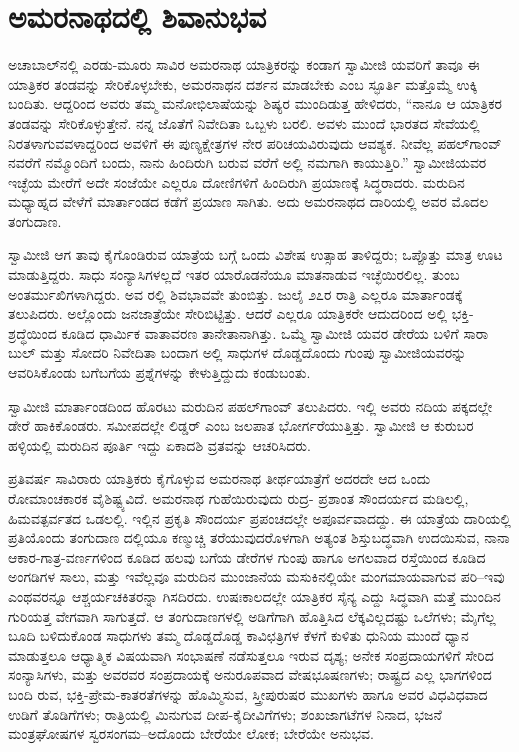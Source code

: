 
\chapter{ಅಮರನಾಥದಲ್ಲಿ ಶಿವಾನುಭವ}

\noindent

ಅಚಾಬಾಲ್​ನಲ್ಲಿ ಎರಡು-ಮೂರು ಸಾವಿರ ಅಮರನಾಥ ಯಾತ್ರಿಕರನ್ನು ಕಂಡಾಗ ಸ್ವಾಮೀಜಿ ಯವರಿಗೆ ತಾವೂ ಈ ಯಾತ್ರಿಕರ ತಂಡವನ್ನು ಸೇರಿಕೊಳ್ಳಬೇಕು, ಅಮರನಾಥನ ದರ್ಶನ ಮಾಡಬೇಕು ಎಂಬ ಸ್ಫೂರ್ತಿ ಮತ್ತೊಮ್ಮೆ ಉಕ್ಕಿ ಬಂದಿತು. ಆದ್ದರಿಂದ ಅವರು ತಮ್ಮ ಮನೋಭಿಲಾಷೆಯನ್ನು ಶಿಷ್ಯರ ಮುಂದಿಡುತ್ತ ಹೇಳಿದರು, “ನಾನೂ ಆ ಯಾತ್ರಿಕರ ತಂಡವನ್ನು ಸೇರಿಕೊಳ್ಳುತ್ತೇನೆ. ನನ್ನ ಜೊತೆಗೆ ನಿವೇದಿತಾ ಒಬ್ಬಳು ಬರಲಿ. ಅವಳು ಮುಂದೆ ಭಾರತದ ಸೇವೆಯಲ್ಲಿ ನಿರತಳಾಗುವವಳಾದ್ದರಿಂದ ಅವಳಿಗೆ ಈ ಪುಣ್ಯಕ್ಷೇತ್ರಗಳ ನೇರ ಪರಿಚಯವಿರುವುದು ಆವಶ್ಯಕ. ನೀವೆಲ್ಲ ಪಹಲ್​ಗಾಂವ್​ನವರೆಗೆ ನಮ್ಮೊಂದಿಗೆ ಬಂದು, ನಾನು ಹಿಂದಿರುಗಿ ಬರುವ ವರೆಗೆ ಅಲ್ಲಿ ನಮಗಾಗಿ ಕಾಯುತ್ತಿರಿ.” ಸ್ವಾಮೀಜಿಯವರ ಇಚ್ಛೆಯ ಮೇರೆಗೆ ಅದೇ ಸಂಜೆಯೇ ಎಲ್ಲರೂ ದೋಣಿಗಳಿಗೆ ಹಿಂದಿರುಗಿ ಪ್ರಯಾಣಕ್ಕೆ ಸಿದ್ಧರಾದರು. ಮರುದಿನ ಮಧ್ಯಾಹ್ನದ ವೇಳೆಗೆ ಮಾರ್ತಾಂಡದ ಕಡೆಗೆ ಪ್ರಯಾಣ ಸಾಗಿತು. ಅದು ಅಮರನಾಥದ ದಾರಿಯಲ್ಲಿ ಅವರ ಮೊದಲ ತಂಗುದಾಣ.

ಸ್ವಾಮೀಜಿ ಆಗ ತಾವು ಕೈಗೊಂಡಿರುವ ಯಾತ್ರೆಯ ಬಗ್ಗೆ ಒಂದು ವಿಶೇಷ ಉತ್ಸಾಹ ತಾಳಿದ್ದರು; ಒಪ್ಪೊತ್ತು ಮಾತ್ರ ಊಟ ಮಾಡುತ್ತಿದ್ದರು. ಸಾಧು ಸಂನ್ಯಾಸಿಗಳಲ್ಲದೆ ಇತರ ಯಾರೊಡನೆಯೂ ಮಾತನಾಡುವ ಇಚ್ಛೆಯಿರಲಿಲ್ಲ. ತುಂಬ ಅಂತರ್ಮುಖಿಗಳಾಗಿದ್ದರು. ಅವ ರಲ್ಲಿ ಶಿವಭಾವವೇ ತುಂಬಿತ್ತು. ಜುಲೈ ೨೭ರ ರಾತ್ರಿ ಎಲ್ಲರೂ ಮಾರ್ತಾಂಡಕ್ಕೆ ತಲುಪಿದರು. ಅಲ್ಲೊಂದು ಜನಜಾತ್ರೆಯೇ ಸೇರಿಬಿಟ್ಟಿತ್ತು. ಆದರೆ ಎಲ್ಲರೂ ಯಾತ್ರಿಕರೇ ಆದುದರಿಂದ ಅಲ್ಲಿ ಭಕ್ತಿ-ಶ್ರದ್ಧೆಯಿಂದ ಕೂಡಿದ ಧಾರ್ಮಿಕ ವಾತಾವರಣ ತಾನೇತಾನಾಗಿತ್ತು. ಒಮ್ಮೆ ಸ್ವಾಮೀಜಿ ಯವರ ಡೇರೆಯ ಬಳಿಗೆ ಸಾರಾ ಬುಲ್ ಮತ್ತು ಸೋದರಿ ನಿವೇದಿತಾ ಬಂದಾಗ ಅಲ್ಲಿ ಸಾಧುಗಳ ದೊಡ್ಡದೊಂದು ಗುಂಪು ಸ್ವಾಮೀಜಿಯವರನ್ನು ಆವರಿಸಿಕೊಂಡು ಬಗೆಬಗೆಯ ಪ್ರಶ್ನೆಗಳನ್ನು ಕೇಳುತ್ತಿದ್ದುದು ಕಂಡುಬಂತು.

ಸ್ವಾಮೀಜಿ ಮಾರ್ತಾಂಡದಿಂದ ಹೊರಟು ಮರುದಿನ ಪಹಲ್​ಗಾಂವ್ ತಲುಪಿದರು. ಇಲ್ಲಿ ಅವರು ನದಿಯ ಪಕ್ಕದಲ್ಲೇ ಡೇರೆ ಹಾಕಿಕೊಂಡರು. ಸಮೀಪದಲ್ಲೇ ಲಿಡ್ಡರ್ ಎಂಬ ಜಲಪಾತ ಭೋರ್ಗರೆಯುತ್ತಿತ್ತು. ಸ್ವಾಮೀಜಿ ಆ ಕುರುಬರ ಹಳ್ಳಿಯಲ್ಲಿ ಮರುದಿನ ಪೂರ್ತಿ ಇದ್ದು ಏಕಾದಶಿ ವ್ರತವನ್ನು ಆಚರಿಸಿದರು.

ಪ್ರತಿವರ್ಷ ಸಾವಿರಾರು ಯಾತ್ರಿಕರು ಕೈಗೊಳ್ಳುವ ಅಮರನಾಥ ತೀರ್ಥಯಾತ್ರೆಗೆ ಅದರದೇ ಆದ ಒಂದು ರೋಮಾಂಚಕಾರಕ ವೈಶಿಷ್ಟ್ಯವಿದೆ. ಅಮರನಾಥ ಗುಹೆಯಿರುವುದು ರುದ್ರ- ಪ್ರಶಾಂತ ಸೌಂದರ್ಯದ ಮಡಿಲಲ್ಲಿ, ಹಿಮವತ್ಪರ್ವತದ ಒಡಲಲ್ಲಿ. ಇಲ್ಲಿನ ಪ್ರಕೃತಿ ಸೌಂದರ್ಯ ಪ್ರಪಂಚದಲ್ಲೇ ಅಪೂರ್ವವಾದದ್ದು. ಈ ಯಾತ್ರೆಯ ದಾರಿಯಲ್ಲಿ ಪ್ರತಿಯೊಂದು ತಂಗುದಾಣ ದಲ್ಲಿಯೂ ಕಣ್ಮುಚ್ಚಿ ತರೆಯುವುದರೊಳಗಾಗಿ ಅತ್ಯಂತ ಶಿಸ್ತುಬದ್ಧವಾಗಿ ಉದಯಿಸುವ, ನಾನಾ ಆಕಾರ-ಗಾತ್ರ-ವರ್ಣಗಳಿಂದ ಕೂಡಿದ ಹಲವು ಬಗೆಯ ಡೇರೆಗಳ ಗುಂಪು ಹಾಗೂ ಅಗಲವಾದ ರಸ್ತೆಯಿಂದ ಕೂಡಿದ ಅಂಗಡಿಗಳ ಸಾಲು, ಮತ್ತು ಇವೆಲ್ಲವೂ ಮರುದಿನ ಮುಂಜಾನೆಯ ಮಸುಕಿನಲ್ಲಿಯೇ ಮಂಗಮಾಯವಾಗುವ ಪರಿ–ಇವು ಎಂಥವರನ್ನೂ ಆಶ್ಚರ್ಯಚಕಿತರನ್ನಾ ಗಿಸದಿರದು. ಉಷಃಕಾಲದಲ್ಲೇ ಯಾತ್ರಿಕರ ಸೈನ್ಯ ಎದ್ದು ಸಿದ್ಧವಾಗಿ ಮತ್ತೆ ಮುಂದಿನ ಗುರಿಯತ್ತ ವೇಗವಾಗಿ ಸಾಗುತ್ತದೆ. ಆ ತಂಗುದಾಣಗಳಲ್ಲಿ ಅಡಿಗೆಗಾಗಿ ಹೊತ್ತಿಸಿದ ಲೆಕ್ಕವಿಲ್ಲದಷ್ಟು ಒಲೆಗಳು; ಮೈಗೆಲ್ಲ ಬೂದಿ ಬಳಿದುಕೊಂಡ ಸಾಧುಗಳು ತಮ್ಮ ದೊಡ್ಡದೊಡ್ಡ ಕಾವಿಛತ್ರಿಗಳ ಕೆಳಗೆ ಕುಳಿತು ಧುನಿಯ ಮುಂದೆ ಧ್ಯಾನ ಮಾಡುತ್ತಲೂ ಆಧ್ಯಾತ್ಮಿಕ ವಿಷಯವಾಗಿ ಸಂಭಾಷಣೆ ನಡೆಸುತ್ತಲೂ ಇರುವ ದೃಶ್ಯ; ಅನೇಕ ಸಂಪ್ರದಾಯಗಳಿಗೆ ಸೇರಿದ ಸಂನ್ಯಾಸಿಗಳು, ಮತ್ತು ಅವರವರ ಸಂಪ್ರದಾಯಕ್ಕೆ ಅನುರೂಪವಾದ ವೇಷಭೂಷಣಗಳು; ರಾಷ್ಟ್ರದ ಎಲ್ಲ ಭಾಗಗಳಿಂದ ಬಂದಿ ರುವ, ಭಕ್ತಿ-ಪ್ರೇಮ-ಕಾತರತೆಗಳನ್ನು ಹೊಮ್ಮಿಸುವ, ಸ್ತ್ರೀಪುರುಷರ ಮುಖಗಳು ಹಾಗೂ ಅವರ ವಿಧವಿಧವಾದ ಉಡಿಗೆ ತೊಡಿಗೆಗಳು; ರಾತ್ರಿಯಲ್ಲಿ ಮಿನುಗುವ ದೀಪ-ಕೈದೀವಿಗೆಗಳು; ಶಂಖಜಾಗಟೆಗಳ ನಿನಾದ, ಭಜನೆ ಮಂತ್ರಘೋಷಗಳ ಸ್ವರಸಂಗಮ–ಅದೊಂದು ಬೇರೆಯೇ ಲೋಕ; ಬೇರೆಯೇ ಅನುಭವ.

